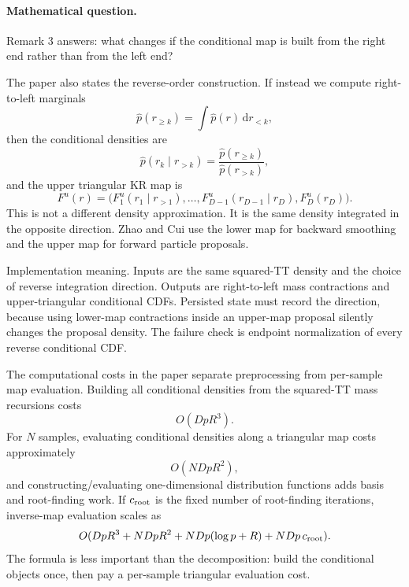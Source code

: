 \documentclass[11pt]{article}
\numberwithin{equation}{section}
\newcommand{\dd}{\,\mathrm d}
\begin{document}
\paragraph{Mathematical question.}
Remark 3 answers: what changes if the conditional map is built from the right
end rather than from the left end?

The paper also states the reverse-order construction.  If instead we compute
right-to-left marginals
\begin{equation}
    \widehat p(r_{\ge k})
    =
    \int \widehat p(r)\dd r_{<k},
    \label{eq:p24-k6}
\end{equation}
then the conditional densities are
\begin{equation}
    \widehat p(r_k\mid r_{>k})
    =
    \frac{\widehat p(r_{\ge k})}{\widehat p(r_{>k})},
    \label{eq:p24-k7}
\end{equation}
and the upper triangular KR map is
\begin{equation}
    F^u(r)
    =
    \bigl(
    F^u_1(r_1\mid r_{>1}),\ldots,
    F^u_{D-1}(r_{D-1}\mid r_D),F^u_D(r_D)
    \bigr).
    \label{eq:p24-k8}
\end{equation}
This is not a different density approximation.  It is the same density
integrated in the opposite direction.  Zhao and Cui \cite{zhao2024ttsequential} use the lower map for
backward smoothing and the upper map for forward particle proposals.

Implementation meaning. Inputs are the same squared-TT density
and the choice of reverse integration direction.  Outputs are right-to-left
mass contractions and upper-triangular conditional CDFs.  Persisted state must
record the direction, because using lower-map contractions inside an upper-map
proposal silently changes the proposal density.  The failure check is endpoint
normalization of every reverse conditional CDF.

The computational costs in the paper separate preprocessing from per-sample
map evaluation.  Building all conditional densities from the squared-TT mass
recursions costs
\begin{equation}
    O(DpR^3).
    \label{eq:p24-k9}
\end{equation}
For \(N\) samples, evaluating conditional densities along a triangular map
costs approximately
\begin{equation}
    O(NDpR^2),
    \label{eq:p24-k10}
\end{equation}
and constructing/evaluating one-dimensional distribution functions adds basis
and root-finding work.  If \(c_{\rm root}\) is the fixed number of root-finding
iterations, inverse-map evaluation scales as
\begin{equation}
    O(DpR^3+NDpR^2+NDp(\log p+R)+NDp\,c_{\rm root}).
    \label{eq:p24-k11}
\end{equation}
The formula is less important than the decomposition: build the conditional
objects once, then pay a per-sample triangular evaluation cost.
\end{document}
